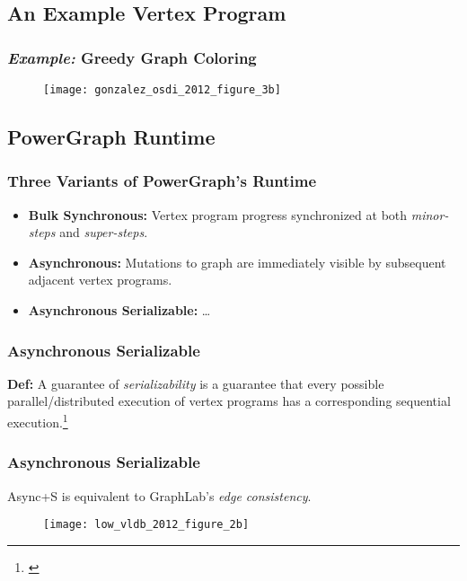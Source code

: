 \subsection{An Example Vertex Program}

\begin{frame}
  \frametitle{\textit{Example:} Greedy Graph Coloring}
  \begin{figure}
    \centering
    \texttt{[image: gonzalez\_osdi\_2012\_figure\_3b]}
    \caption{\cite[OSDI '12]{gonzalez2012powergraph}}
  \end{figure}
\end{frame}


\subsection{PowerGraph Runtime}

\begin{frame}
  \frametitle{Three Variants of PowerGraph's Runtime}
  \begin{itemize}
    \item \textbf{Bulk Synchronous:} Vertex program progress synchronized at
          both \textit{minor-steps} and \textit{super-steps}.
    \item \textbf{Asynchronous:} Mutations to graph are immediately visible by
          subsequent adjacent vertex programs.
    \item \textbf{Asynchronous Serializable:} \ldots
  \end{itemize}
\end{frame}

\begin{frame}
  \frametitle{Asynchronous Serializable}
  \textbf{Def:} A guarantee of \textit{serializability} is a guarantee that
    every possible parallel/distributed execution of vertex programs has a
    corresponding sequential execution.\footnote{\cite[OSDI '12]{gonzalez2012powergraph}}
\end{frame}

\begin{frame}
  \frametitle{Asynchronous Serializable}
  \centering
  Async+S is equivalent to GraphLab's \textit{edge consistency}.
  \begin{figure}
    \texttt{[image: low\_vldb\_2012\_figure\_2b]}
    \caption{\cite[VLDB '12]{low2012distributed}}
  \end{figure}
\end{frame}
